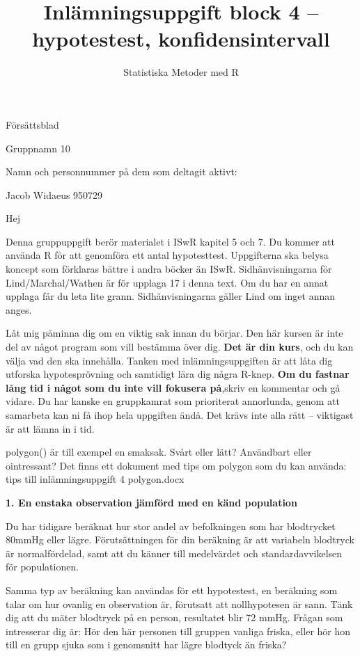 \documentclass[
  letterpaper,
  DIV=11,
  numbers=noendperiod]{scrartcl}
\title{Inlämningsuppgift block 4 -- hypotestest, konfidensintervall}
\author{Statistiska Metoder med R}
\date{}
\begin{document}
\maketitle

Försättsblad

Gruppnamn 10

Namn och personnummer på dem som deltagit aktivt:

Jacob Widaeus 950729

Hej

Denna gruppuppgift berör materialet i ISwR kapitel 5 och 7. Du kommer
att använda R för att genomföra ett antal hypotesttest. Uppgifterna ska
belysa koncept som förklaras bättre i andra böcker än ISwR.
Sidhänvisningarna för Lind/Marchal/Wathen är för upplaga 17 i denna
text. Om du har en annat upplaga får du leta lite grann.
Sidhänvisningarna gäller Lind om inget annan anges.

Låt mig påminna dig om en viktig sak innan du börjar. Den här kursen är
inte del av något program som vill bestämma över dig. \textbf{Det är din
kurs}, och du kan välja vad den ska innehålla. Tanken med
inlämningsuppgiften är att låta dig utforska hypotesprövning och
samtidigt lära dig några R-knep. \textbf{Om du fastnar lång tid i något
som du inte vill fokusera på},skriv en kommentar och gå vidare. Du har
kanske en gruppkamrat som prioriterat annorlunda, genom att samarbeta
kan ni få ihop hela uppgiften ändå. Det krävs inte alla rätt --
viktigast är att lämna in i tid.

polygon() är till exempel en smaksak. Svårt eller lätt? Användbart eller
ointressant? Det finns ett dokument med tips om polygon som du kan
använda: tips till inlämningsuppgift 4 polygon.docx

\textbf{1. En enstaka observation jämförd med en känd population}

Du har tidigare beräknat hur stor andel av befolkningen som har
blodtrycket 80mmHg eller lägre. Förutsättningen för din beräkning är att
variabeln blodtryck är normalfördelad, samt att du känner till
medelvärdet och standardavvikelsen för populationen.

Samma typ av beräkning kan användas för ett hypotestest, en beräkning
som talar om hur ovanlig en observation är, förutsatt att nollhypotesen
är sann. Tänk dig att du mäter blodtryck på en person, resultatet blir
72 mmHg. Frågan som intresserar dig är: Hör den här personen till
gruppen vanliga friska, eller hör hon till en grupp sjuka som i
genomsnitt har lägre blodtyck än friska?
\end{document}
